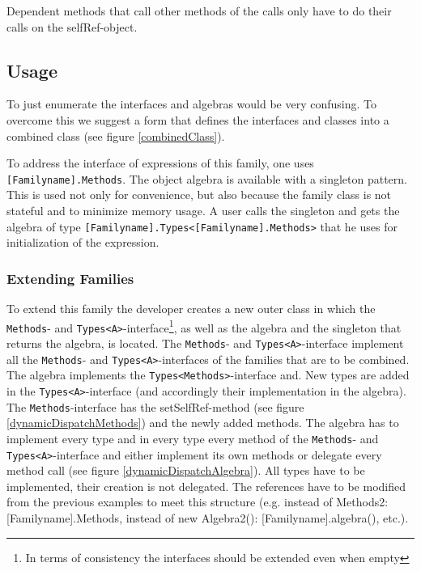 \documentclass{report}
\begin{document}
Dependent methods that call other methods of the calls only have to do their calls on the selfRef-object.

\subsection{Usage}
\label{combiningTheParts}
To just enumerate the interfaces and algebras would be very confusing. To overcome this we suggest a form that defines the interfaces and classes into a combined class (see figure \ref{combinedClass}).

To address the interface of expressions of this family, one uses \lstinline{[Familyname].Methods}. The object algebra is available with a singleton pattern. This is used not only for convenience, but also because the family class is not stateful and to minimize memory usage. A user calls the singleton and gets the algebra of type \lstinline{[Familyname].Types<[Familyname].Methods>} that he uses for initialization of the expression.

\subsubsection*{Extending Families}

To extend this family the developer creates a new outer class in which the \lstinline{Methods}- and \lstinline{Types<A>}-interface\footnote{In terms of consistency the interfaces should be extended even when empty}, as well as the algebra and the singleton that returns the algebra, is located. The \lstinline{Methods}- and \lstinline{Types<A>}-interface implement all the \lstinline{Methods}- and \lstinline{Types<A>}-interfaces of the families that are to be combined. The algebra implements the \lstinline{Types<Methods>}-interface and. New types are added in the \lstinline{Types<A>}-interface (and accordingly their implementation in the algebra). The \lstinline{Methods}-interface has the setSelfRef-method (see figure \ref{dynamicDispatchMethods}) and the newly added methods. The algebra has to implement every type and in every type every method of the \lstinline{Methods}- and \lstinline{Types<A>}-interface and either implement its own methods or delegate every method call (see figure \ref{dynamicDispatchAlgebra}). All types have to be implemented, their creation is not delegated. The references have to be modified from the previous examples to meet this structure (e.g. instead of Methods2: [Familyname].Methods, instead of new Algebra2(): [Familyname].algebra(), etc.).
\end{document}
